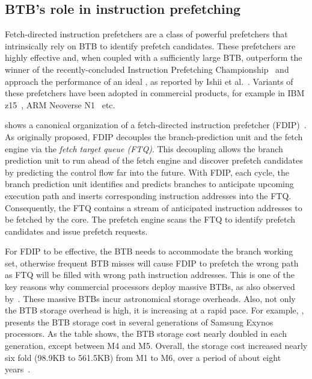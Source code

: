 \subsection{BTB's role in instruction prefetching}
Fetch-directed instruction prefetchers are a class of powerful  prefetchers that intrinsically rely on BTB to identify prefetch candidates. 
These prefetchers are highly effective and, when coupled with a sufficiently large BTB, outperform the winner of the recently-concluded Instruction Prefetching Championship~\cite{ipc1} and approach the performance of an ideal , as reported by Ishii et al.~\cite{rebase}. Variants of these prefetchers have been adopted in commercial products, for example in IBM z15~\cite{IBMz15HotChips}, ARM Neoverse N1~\cite{neoverse} etc.

 shows a canonical organization of a fetch-directed instruction prefetcher (FDIP)~\cite{fdip}. 
As originally proposed, FDIP decouples the branch-prediction unit and the fetch engine via the {\em fetch target queue (FTQ)}. This decoupling allows the branch prediction unit to run ahead of the fetch engine and discover prefetch candidates by predicting the control flow far into the future. With FDIP, each cycle, the branch prediction unit identifies and predicts branches to anticipate upcoming execution path and inserts corresponding instruction addresses into the FTQ. Consequently, the FTQ contains a stream of anticipated instruction addresses to be fetched by the core. The prefetch engine scans the FTQ to identify prefetch candidates and issue prefetch requests. 

For FDIP to be effective, the BTB needs to accommodate the branch working set, otherwise frequent BTB misses will cause FDIP to prefetch the wrong path as FTQ will be filled with wrong path instruction addresses. This is one of the key reasons why commercial processors deploy massive BTBs, as also observed by~\cite{rebase}. These massive BTBs incur astronomical storage overheads. Also, not only the BTB storage overhead is high, it is increasing at a rapid pace. For example, , presents the BTB storage cost in several generations of Samsung Exynos processors. As the table shows, the BTB storage cost nearly doubled in each generation, except between M4 and M5. Overall, the storage cost increased nearly six fold (98.9KB to 561.5KB) from M1 to M6, over a period of about eight years~\cite{exynos}.

